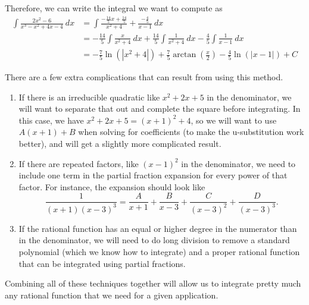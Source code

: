 \documentclass{ximera}
\begin{document}
\begin{exampleSol}
\begin{equation*}
    \end{equation*}
    Therefore, we can write the integral we want to compute as
    \begin{equation*}
        \begin{split}
            \int \frac{2x^2 - 6}{x^3 - x^2 + 4x - 4}\ dx &= \int  \frac{-\frac{14}{5}x + \frac{14}{5}}{x^2 + 4} + \frac{-\frac{4}{5}}{x-1}\ dx \\
            &= -\frac{14}{5} \int \frac{x}{x^2 + 4}\ dx + \frac{14}{5} \int \frac{1}{x^2 + 4}\ dx - \frac{4}{5} \int \frac{1}{x-1}\ dx \\
            &= -\frac{7}{5}\ln(|x^2 + 4|) + \frac{7}{5} \arctan\left(\frac{x}{2}\right) - \frac{4}{5}\ln(|x-1|) + C
        \end{split}
    \end{equation*}
\end{exampleSol}

There are a few extra complications that can result from using this method.
\begin{enumerate}
    \item If there is an irreducible quadratic like $x^2 + 2x + 5$ in the denominator, we will want to separate that out and complete the square before integrating. In this case, we have $x^2 + 2x + 5 = (x+1)^2 + 4$, so we will want to use $A(x+1) + B$ when solving for coefficients (to make the u-substitution work better), and will get a slightly more complicated result.
    \item If there are repeated factors, like $(x-1)^2$ in the denominator, we need to include one term in the partial fraction expansion for every power of that factor. For instance, the expansion should look like
        \begin{equation*}
            \frac{1}{(x+1)(x-3)^3} = \frac{A}{x+1} + \frac{B}{x-3} + \frac{C}{(x-3)^2} + \frac{D}{(x-3)^3}.
    \end{equation*}
    \item If the rational function has an equal or higher degree in the numerator than in the denominator, we will need to do long division to remove a standard polynomial (which we know how to integrate) and a proper rational function that can be integrated using partial fractions.
\end{enumerate}

Combining all of these techniques together will allow us to integrate pretty much any rational function that we need for a given application. 
\end{document}
